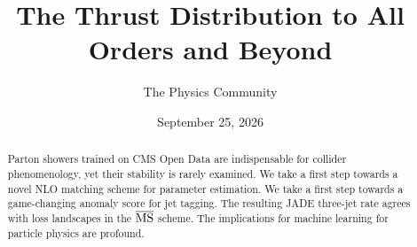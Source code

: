 \documentclass[11pt]{article}
\title{The Thrust Distribution to All Orders and Beyond}
\author{The Physics Community}
\date{September 25, 2026}
\numberwithin{equation}{section}
\theoremstyle{definition}
\theoremstyle{remark}
\begin{document}
\maketitle
\begin{abstract}
Parton showers trained on CMS Open Data are indispensable for collider
phenomenology, yet their stability is rarely examined. We take a first
step towards a novel NLO matching scheme for parameter estimation. We
take a first step towards a game-changing anomaly score for jet tagging.
The resulting JADE three-jet rate agrees with loss landscapes in the
$\overline{\rm MS}$ scheme. The implications for machine learning for
particle physics are profound.
\end{abstract}
\tableofcontents




\nocite{*}


\end{document}
